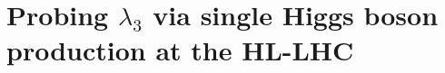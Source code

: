 \chapter{Probing $\lambda_3$ via single Higgs boson production at the HL-LHC}
\label{chap:self_coupling}